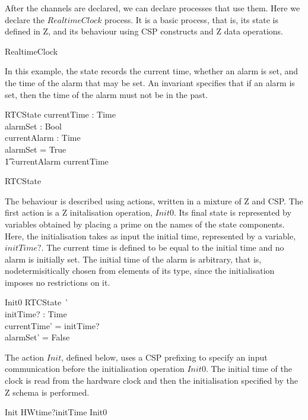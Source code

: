\documentclass[a4paper,10pt]{report}
\begin{document}
%
After the channels are declared, we can declare processes that use them. Here we
declare the $RealtimeClock$ process. It is a basic process, that is, its state
is defined in Z, and its behaviour using CSP constructs and Z data operations.
%
\begin{circus}
  \circprocess RealtimeClock \circdef \circbegin
\end{circus}
%
In this example, the state records the current time, whether an alarm is set,
and the time of the alarm that may be set. An invariant specifies that if an
alarm is set, then the time of the alarm must not be in the past.
%
\begin{schema}{RTCState}
  currentTime  : Time \\
  alarmSet     : Bool \\
  currentAlarm : Time \\
\where
  alarmSet = True \implies \\
  \t1 currentAlarm \geq currentTime
\end{schema}
\begin{circusaction}
  \circstate RTCState
\end{circusaction}
%
The behaviour is described using actions, written in a mixture of Z and CSP. The
first action is a Z initalisation operation, $Init0$.  Its final state is
represented by variables obtained by placing a prime on the names of the state
components.  Here, the initialisation takes as input the initial time,
represented by a variable, $initTime?$. The current time is defined to be equal
to the initial time and no alarm is initially set. The initial time of the alarm
is arbitrary, that is, nodetermisitically chosen from elements of its type,
since the initialisation imposes no restrictions on it.
%
\begin{schema}{Init0}
  RTCState~' \\
  initTime? : Time \\
\where
  currentTime' = initTime? \\
  alarmSet' = False \\
\end{schema}
%
The action $Init$, defined below, uses a CSP prefixing to specify an input
communication before the initialisation operation $Init0$.  The initial time of
the clock is read from the hardware clock and then the initialisation specified
by the Z schema is performed.
%
\begin{circusaction}
  Init \circdef HWtime?initTime \then Init0
\end{circusaction}
\end{document}
